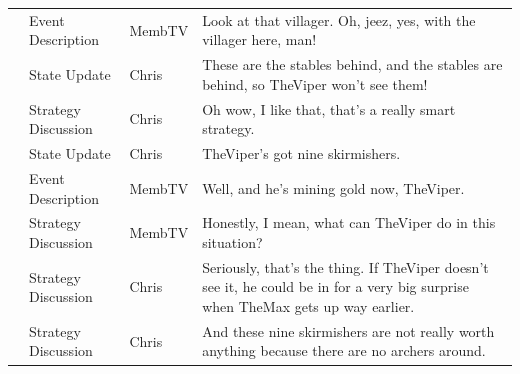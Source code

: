 {\begin{longtable}{@{}>{\theAppRow}r|L{2.3cm}L{1.0cm}U{11.55cm}@{}}
    & Event Description     & MembTV       & Look at that villager. Oh, jeez, yes, with the villager here, man!                                                                                                                                                                                               \\
    & State Update          & Chris        & These are the stables behind, and the stables are behind, so TheViper won't see them!                                                                                                                                                                            \\
    & Strategy Discussion   & Chris        & Oh wow, I like that, that's a really smart strategy.                                                                                                                                                                                                             \\
    & State Update          & Chris        & TheViper's got nine skirmishers.                                                                                                                                                                                                                                 \\
    & Event Description     & MembTV       & Well, and he's mining gold now, TheViper.                                                                                                                                                                                                                        \\
    & Strategy Discussion   & MembTV       & Honestly, I mean, what can TheViper do in this situation?                                                                                                                                                                                                        \\
    & Strategy Discussion   & Chris        & Seriously, that's the thing. If TheViper doesn't see it, he could be in for a very big surprise when TheMax gets up way earlier.                                                                                                                                 \\
    & Strategy Discussion   & Chris        & And these nine skirmishers are not really worth anything because there are no archers around.                                                                                                                                                                    \\

\end{longtable}}

